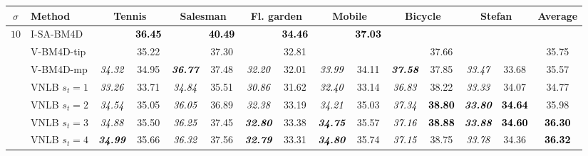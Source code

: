 \documentclass[10pt, journal, twocolumn, final, a4paper]{IEEEtran}
\newcommand{\bsic}[1]{\textcolor{black}{\textit{#1}}}
\newcommand{\Bsic}[1]{\textcolor{black}{\textbf{\textit{#1}}}}
\newcommand{\Best}[1]{\textbf{\textcolor{black}{#1}}}
\begin{document}
\begin{table}[htp!]
	\begin{center}
		{\small
		\renewcommand{\tabcolsep}{1.6mm}
		\renewcommand{\arraystretch}{1.3}
		\begin{tabular}{ c | l |c c | c c | c c | c c | c c | c c | c }
			\hline
			\rule{0pt}{6pt}$\sigma$ & Method             & \multicolumn{2}{c}{Tennis}  & \multicolumn{2}{c}{Salesman} &\multicolumn{2}{c}{Fl. garden}& \multicolumn{2}{c}{Mobile}  & \multicolumn{2}{c}{Bicycle}  & \multicolumn{2}{c|}{Stefan} &      Average \\\hline
			\multirow{1}{*}{$10$}
			                      & I-SA-BM4D            & \bsic{     } & \Best{36.45} & \bsic{     } & \Best{40.49}  & \bsic{     } & \Best{34.46}  & \bsic{     } & \Best{37.03} &              &               &              &              &              \\
			                      & V-BM4D-tip           & \bsic{     } &       35.22  & \bsic{     } &       37.30   & \bsic{     } &       32.81   &              &              &              &       37.66   &              &              &       35.75  \\
			                      & V-BM4D-mp            & \bsic{34.32} &       34.95  & \Bsic{36.77} &       37.48   & \bsic{32.20} &       32.01   & \bsic{33.99} &       34.11  & \Bsic{37.58} &       37.85   & \bsic{33.47} &       33.68  &       35.57  \\
			                      & VNLB   $s_t = 1$     & \bsic{33.26} &       33.71  & \bsic{34.84} &       35.51   & \bsic{30.86} &       31.62   & \bsic{32.40} &       33.14  & \bsic{36.83} &       38.22   & \bsic{33.33} &       34.07  &       34.77  \\
			                      & VNLB   $s_t = 2$     & \bsic{34.54} &       35.05  & \bsic{36.05} &       36.89   & \bsic{32.38} &       33.19   & \bsic{34.21} &       35.03  & \bsic{37.34} & \Best{38.80}  & \Bsic{33.80} & \Best{34.64} &       35.98  \\
			                      & VNLB   $s_t = 3$     & \bsic{34.88} &       35.50  & \bsic{36.25} &       37.45   & \Bsic{32.80} &       33.38   & \Bsic{34.75} &       35.57  & \bsic{37.16} & \Best{38.88}  & \Bsic{33.88} & \Best{34.60} & \Best{36.30} \\
			                      & VNLB   $s_t = 4$     & \Bsic{34.99} &       35.66  & \bsic{36.32} &       37.56   & \Bsic{32.79} &       33.31   & \Bsic{34.80} &       35.74  & \bsic{37.15} &      {38.75}  & \bsic{33.78} &       34.36  & \Best{36.32} \\\hline

\end{tabular}}
\end{center}
\end{table}
\end{document}
